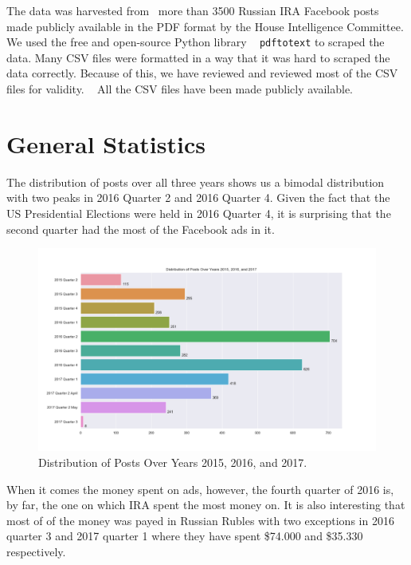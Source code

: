 \documentclass[12pt]{article}
\theoremstyle{definition}
\begin{document}
The data was harvested from~\cite{ira2016data} more than 3500 Russian IRA
Facebook posts made publicly available in the PDF format by the House
Intelligence Committee. We used the free and open-source Python library
~\cite{pdftotext} \texttt{pdftotext} to scraped the data. Many CSV files were
formatted in a way that it was hard to scraped the data correctly. Because of
this, we have reviewed and reviewed most of the CSV files for validity.
~\cite{ira2016csvdata} All the CSV files have been made publicly available.


\section*{\centering General Statistics}
The distribution of posts over all three years shows us a bimodal distribution
with two peaks in 2016 Quarter 2 and 2016 Quarter 4. Given the fact that the US
Presidential Elections were held in 2016 Quarter 4, it is surprising that the
second quarter had the most of the Facebook ads in it.

\begin{figure}[H]
\centering
\includegraphics[width=\textwidth]{../visualization/barchart-plots/barchart_distribution_of_posts.png}
\caption*{Distribution of Posts Over Years 2015, 2016, and 2017.}
\end{figure}

When it comes the money spent on ads, however, the fourth quarter of 2016 is,
by far, the one on which IRA spent the most money on. It is also interesting
that most of of the money was payed in Russian Rubles with two exceptions in
2016 quarter 3 and 2017 quarter 1 where they have spent \$74.000 and \$35.330
respectively.
\end{document}
